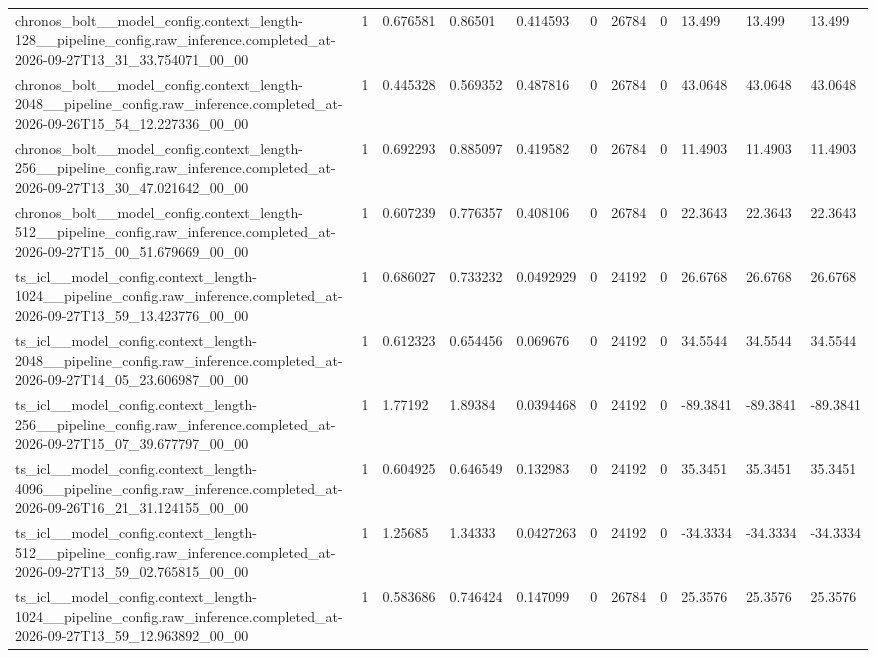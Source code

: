 \begin{tabular}{lllllllllll}
chronos\_bolt\_\_model\_config.context\_length-128\_\_pipeline\_config.raw\_inference.completed\_at-2026-09-27T13\_31\_33.754071\_00\_00 & 1 & 0.676581 & 0.86501 & 0.414593 & 0 & 26784 & 0 & 13.499 & 13.499 & 13.499 \\
chronos\_bolt\_\_model\_config.context\_length-2048\_\_pipeline\_config.raw\_inference.completed\_at-2026-09-26T15\_54\_12.227336\_00\_00 & 1 & 0.445328 & 0.569352 & 0.487816 & 0 & 26784 & 0 & 43.0648 & 43.0648 & 43.0648 \\
chronos\_bolt\_\_model\_config.context\_length-256\_\_pipeline\_config.raw\_inference.completed\_at-2026-09-27T13\_30\_47.021642\_00\_00 & 1 & 0.692293 & 0.885097 & 0.419582 & 0 & 26784 & 0 & 11.4903 & 11.4903 & 11.4903 \\
chronos\_bolt\_\_model\_config.context\_length-512\_\_pipeline\_config.raw\_inference.completed\_at-2026-09-27T15\_00\_51.679669\_00\_00 & 1 & 0.607239 & 0.776357 & 0.408106 & 0 & 26784 & 0 & 22.3643 & 22.3643 & 22.3643 \\
ts\_icl\_\_model\_config.context\_length-1024\_\_pipeline\_config.raw\_inference.completed\_at-2026-09-27T13\_59\_13.423776\_00\_00 & 1 & 0.686027 & 0.733232 & 0.0492929 & 0 & 24192 & 0 & 26.6768 & 26.6768 & 26.6768 \\
ts\_icl\_\_model\_config.context\_length-2048\_\_pipeline\_config.raw\_inference.completed\_at-2026-09-27T14\_05\_23.606987\_00\_00 & 1 & 0.612323 & 0.654456 & 0.069676 & 0 & 24192 & 0 & 34.5544 & 34.5544 & 34.5544 \\
ts\_icl\_\_model\_config.context\_length-256\_\_pipeline\_config.raw\_inference.completed\_at-2026-09-27T15\_07\_39.677797\_00\_00 & 1 & 1.77192 & 1.89384 & 0.0394468 & 0 & 24192 & 0 & -89.3841 & -89.3841 & -89.3841 \\
ts\_icl\_\_model\_config.context\_length-4096\_\_pipeline\_config.raw\_inference.completed\_at-2026-09-26T16\_21\_31.124155\_00\_00 & 1 & 0.604925 & 0.646549 & 0.132983 & 0 & 24192 & 0 & 35.3451 & 35.3451 & 35.3451 \\
ts\_icl\_\_model\_config.context\_length-512\_\_pipeline\_config.raw\_inference.completed\_at-2026-09-27T13\_59\_02.765815\_00\_00 & 1 & 1.25685 & 1.34333 & 0.0427263 & 0 & 24192 & 0 & -34.3334 & -34.3334 & -34.3334 \\
ts\_icl\_\_model\_config.context\_length-1024\_\_pipeline\_config.raw\_inference.completed\_at-2026-09-27T13\_59\_12.963892\_00\_00 & 1 & 0.583686 & 0.746424 & 0.147099 & 0 & 26784 & 0 & 25.3576 & 25.3576 & 25.3576 \\

\end{tabular}
